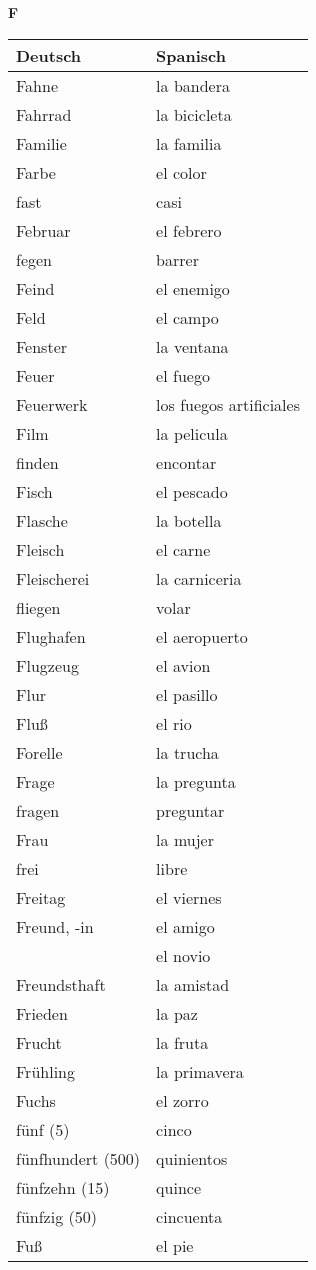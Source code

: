 \begin{flushright}\begin{Huge}\textbf{F}\end{Huge}\end{flushright}

\begin{longtable}{p{} p{}} 
\textbf{Deutsch}     & \textbf{Spanisch}                                       \\ \hline
\hline
\endhead %
Fahne & la bandera\\
Fahrrad & la bicicleta\\
Familie & la familia\\
Farbe & el color\\
fast & casi \\
Februar & el febrero\\
fegen & barrer\\
Feind & el enemigo\\
Feld & el campo\\
Fenster & la ventana\\
Feuer & el fuego\\
Feuerwerk & los fuegos artificiales\\
Film & la pelicula\\
finden & encontar\\
Fisch & el pescado\\
Flasche & la botella\\
Fleisch & el carne \\
Fleischerei & la carniceria\\
fliegen & volar\\
Flughafen & el aeropuerto\\
Flugzeug & el avion\\
Flur & el pasillo\\
Fluß & el rio\\
Forelle & la trucha \\
Frage & la pregunta\\
fragen & preguntar\\
Frau & la mujer \\
frei & libre\\
Freitag & el viernes\\
Freund, -in & el amigo\\
~ & el novio\\
Freundsthaft & la amistad\\
Frieden & la paz\\
Frucht & la fruta\\
Frühling & la primavera\\
Fuchs & el zorro\\
fünf (5) & cinco \\
fünfhundert (500) & quinientos\\
fünfzehn (15) & quince\\
fünfzig (50) & cincuenta\\
Fuß & el pie\\
\end{longtable}
